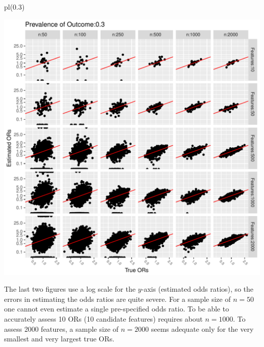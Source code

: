 \begin{Schunk}
\begin{Sinput}
pl(0.3)
\end{Sinput}


\centerline{\includegraphics[width=\maxwidth]{hdata-simor-plotb-1} }

\end{Schunk}
The last two figures use a log scale for the $y$-axis (estimated odds
ratios), so the errors in estimating the odds ratios are quite
severe.  For a sample size of $n=50$ one cannot even estimate a single
pre-specified odds ratio.  To be able to accurately assess 10 ORs (10
candidate features) requires about $n=1000$.  To assess 2000 features,
a sample size of $n=2000$ seems adequate only for the very smallest
and very largest true ORs.

